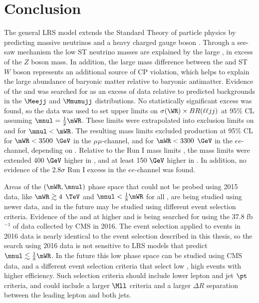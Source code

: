 \chapter{Conclusion}
\label{conclusion_chapter}
The general LRS model extends the Standard Theory of particle physics by predicting massive neutrinos \nul and a heavy charged 
gauge boson \WR.  Through a see-saw mechanism the low ST neutrino masses are explained by the large \mnul, in excess of the $Z$ 
boson mass.  In addition, the large mass difference between the \WR and ST $W$ boson represents an additional source of CP 
violation, which helps to explain the large abundance of baryonic matter relative to baryonic antimatter.  Evidence of the \WR 
and \nul was searched for as an excess of data relative to predicted backgrounds in the $\Meejj$ and $\Mmumujj$ distributions.  
No statistically significant excess was found, so the data was used to set upper limits on $\sigma(\WR) \times BR(\ell\ell jj)$ 
at 95\% CL assuming $\mnul = \frac{1}{2}\mWR$.  These limits were extrapolated into exclusion limits on \mWR and \mnul for 
$\mnul < \mWR$.  The resulting mass limits excluded \WR production at 95\% CL for $\mWR < 3500$ $\GeV$ in the $\mu\mu$-channel, 
and for $\mWR < 3300$ $\GeV$ in the $ee$-channel, depending on \mnul.  Relative to the Run I mass limits \cite{cmsWRRunOneResults}, 
the mass limits were extended 400 $\GeV$ higher in \mWR, and at least 150 $\GeV$ higher in \mnul.  In addition, no evidence of 
the 2.8$\sigma$ Run I excess in the $ee$-channel was found.

Areas of the $(\mWR, \mnul)$ phase space that could not be probed using 2015 data, like $\mWR \gtrsim 4$ $\TeV$ and $\mnul < 
\frac{1}{8}\mWR$ for all \mWR, are being studied using newer data, and in the future may be studied using different event selection 
criteria.  Evidence of the \WR and \nul at higher \mWR and \mnul is being searched for using the 37.8 fb$^{-1}$ of data \cite{lumi} 
collected by CMS in 2016.  The event selection applied to events in 2016 data is nearly identical to the event selection described 
in this thesis, so the search using 2016 data is not sensitive to LRS models that predict $\mnul \lesssim \frac{1}{8}\mWR$.  In 
the future this low \mnul phase space can be studied using CMS data, and a different event selection criteria that select low \mnul, 
high \mWR events with higher efficiency.  Such selection criteria should include lower lepton and jet $\pt$ criteria, and could include 
a larger $\Mll$ criteria and a larger $\Delta R$ separation between the leading lepton and both jets.


